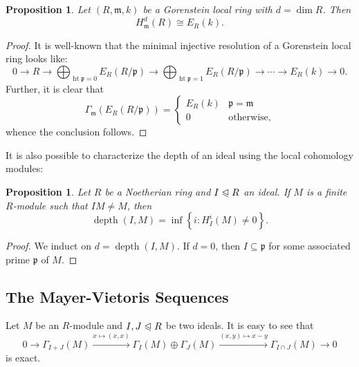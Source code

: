 \documentclass[10pt]{article}
\theoremstyle{thmstyle}
\newtheorem{proposition}[theorem]{Proposition}
\theoremstyle{defstyle}
\newcommand{\frakm}{\mathfrak{m}} %
\newcommand{\frakp}{\mathfrak{p}} %
\newcommand{\noreq}{\trianglelefteqslant}
\newcommand{\hght}{\operatorname{ht}}
\newcommand{\depth}{\operatorname{depth}}
\begin{document}
\begin{proposition}
	Let $(R,\frakm,k)$ be a Gorenstein local ring with $d = \dim R$. Then 
	\begin{equation*}
		H^d_{\frakm}(R)\cong E_R(k).
	\end{equation*}
\end{proposition}
\begin{proof}
	It is well-known that the minimal injective resolution of a Gorenstein local ring looks like:
	\begin{equation*}
		0\to R\to\bigoplus_{\hght\frakp = 0} E_R(R/\frakp)\to\bigoplus_{\hght\frakp = 1} E_R(R/\frakp)\to\cdots\to E_R(k)\to 0.
	\end{equation*}
	Further, it is clear that 
	\begin{equation*}
		\Gamma_{\frakm}\left(E_R(R/\frakp)\right) = 
		\begin{cases}
			E_R(k) & \frakp = \frakm\\
			0 & \text{otherwise},
		\end{cases}
	\end{equation*}
	whence the conclusion follows.
\end{proof}

It is also possible to characterize the depth of an ideal using the local cohomology modules: 
\begin{proposition}
	Let $R$ be a Noetherian ring and $I\noreq R$ an ideal. If $M$ is a finite $R$-module such that $IM\ne M$, then 
	\begin{equation*}
		\depth(I, M) = \inf\left\{i\colon H^i_I(M)\ne 0\right\}.
	\end{equation*}
\end{proposition}
\begin{proof}
	We induct on $d = \depth(I, M)$. If $d = 0$, then $I\subseteq\frakp$ for some associated prime $\frakp$ of $M$. %
\end{proof}

\subsection{The Mayer-Vietoris Sequences}

Let $M$ be an $R$-module and $I, J\noreq R$ be two ideals. It is easy to see that
\begin{equation*}
	0\to\Gamma_{I + J}(M)\xrightarrow{x\mapsto(x, x)}\Gamma_I(M)\oplus\Gamma_J(M)\xrightarrow{(x, y)\mapsto x - y}\Gamma_{I\cap J}(M)\to 0
\end{equation*}
is exact. 
\end{document}
